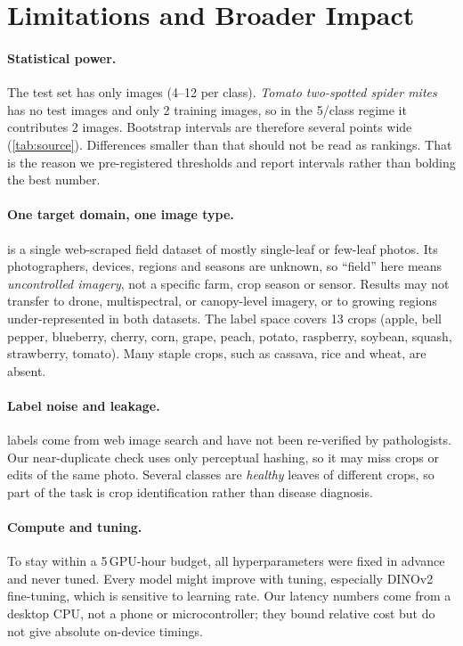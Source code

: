 \section{Limitations and Broader Impact}
\label{sec:limits}

\paragraph{Statistical power.}
The \PD test set has only \PDtestN images (4--12 per class). \emph{Tomato two-spotted spider mites} has no test images and only 2 training images, so in the 5/class regime it contributes 2 images. Bootstrap intervals are therefore several points wide (\cref{tab:source}). Differences smaller than that should not be read as rankings. That is the reason we pre-registered thresholds and report intervals rather than bolding the best number.

\paragraph{One target domain, one image type.}
\PD is a single web-scraped field dataset of mostly single-leaf or few-leaf photos. Its photographers, devices, regions and seasons are unknown, so ``field'' here means \emph{uncontrolled imagery}, not a specific farm, crop season or sensor. Results may not transfer to drone, multispectral, or canopy-level imagery, or to growing regions under-represented in both datasets. The label space covers 13 crops (apple, bell pepper, blueberry, cherry, corn, grape, peach, potato, raspberry, soybean, squash, strawberry, tomato). Many staple crops, such as cassava, rice and wheat, are absent.

\paragraph{Label noise and leakage.}
\PD labels come from web image search and have not been re-verified by pathologists. Our near-duplicate check uses only perceptual hashing, so it may miss crops or edits of the same photo. Several \PD classes are \emph{healthy} leaves of different crops, so part of the task is crop identification rather than disease diagnosis.

\paragraph{Compute and tuning.}
To stay within a 5\,GPU-hour budget, all hyperparameters were fixed in advance and never tuned. Every model might improve with tuning, especially DINOv2 fine-tuning, which is sensitive to learning rate. Our latency numbers come from a desktop CPU, not a phone or microcontroller; they bound relative cost but do not give absolute on-device timings.

